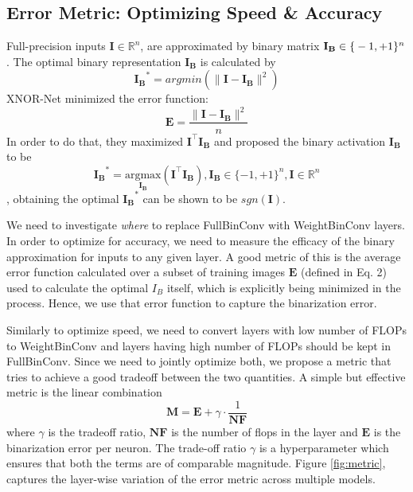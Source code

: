 \documentclass[10pt,twocolumn,letterpaper]{article}
\begin{document}
\subsection{Error Metric: Optimizing Speed \& Accuracy}
Full-precision inputs $\mathbf{I} \in \mathbb{R}^n$, are approximated by binary matrix $\mathbf{I_B} \in \mathbb\{-1,+1\}^n$. The optimal binary representation $\mathbf{I_B}$ is calculated by
\begin{equation}\mathbf{I_B}^\ast  = argmin(\parallel\mathbf{I}-\mathbf{I_B}\parallel^2)\end{equation}
XNOR-Net\cite{rastegari2016xnor} minimized the error function:
\begin{equation} \mathbf{E} = \frac{\parallel \mathbf{I} - \mathbf{I_B} \parallel^2}{n}\end{equation}
In order to do that, they maximized $\mathbf{I}^\top\mathbf{I_B}$ and proposed the binary activation $\mathbf{I_B}$ to be 
\begin{equation}\mathbf{I_B}^\ast = \underset{\mathbf{\mathbf{I_B}}}{\mathrm{argmax}}(\mathbf{I}^\top\mathbf{I_B}), \mathbf{I_B} \in \{-1,+1\}^n , \mathbf{I} \in \mathbb{R}^n \end{equation}, obtaining the optimal $\mathbf{I_B}^\ast$ can be shown to be  $sgn(\mathbf{I}).$

We need to investigate {\it where} to replace FullBinConv with WeightBinConv layers. In order to optimize for accuracy, we need to measure the efficacy of the binary approximation for inputs to any given layer. A good metric of this is the average error function calculated over a subset of training images $\mathbf{E}$ (defined in Eq. 2) used to calculate the optimal $I_B$ itself, which is explicitly being minimized in the process. Hence, we use that error function to capture the binarization error.

Similarly to optimize speed, we need to convert layers with low number of FLOPs to WeightBinConv and layers having high number of FLOPs should be kept in FullBinConv. Since we need to jointly optimize both, we propose a metric that tries to achieve a good tradeoff between the two quantities. A simple but effective metric is the linear combination \begin{equation} \mathbf{M} = \mathbf{E} + \gamma \cdot \frac{1}{\mathbf{NF}} \end{equation} where $\gamma$ is the tradeoff ratio, $\mathbf{NF}$ is the number of flops in the layer and $\mathbf{E}$ is the binarization error per neuron. The trade-off ratio $\gamma$ is a hyperparameter which ensures that both the terms are of comparable magnitude. Figure \ref{fig:metric}, captures the layer-wise variation of the error metric across multiple models.
\end{document}
